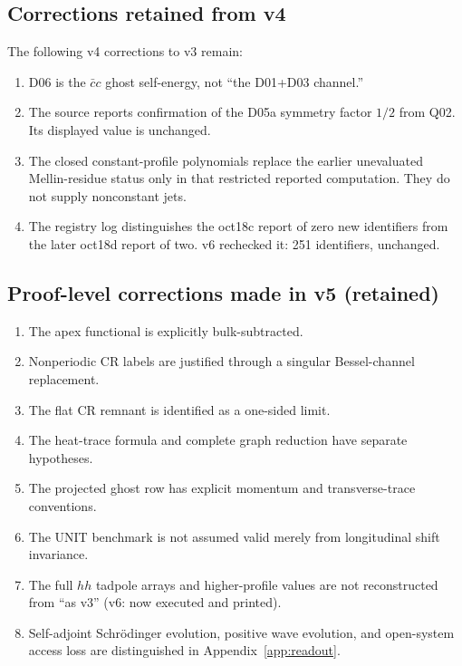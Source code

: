 \documentclass[11pt,a4paper]{article}
\theoremstyle{plain}
\theoremstyle{definition}
\theoremstyle{remark}
\numberwithin{equation}{section}
\begin{document}
\subsection{Corrections retained from v4}

The following v4 corrections to v3 remain:
\begin{enumerate}[label=\textup{(\roman*)}]
\item D06 is the \(\bar c c\) ghost self-energy, not
``the D01+D03 channel.''

\item The source reports confirmation of the D05a symmetry factor
\(1/2\) from Q02. Its displayed value is unchanged.

\item The closed constant-profile polynomials replace the earlier
unevaluated Mellin-residue status only in that restricted
reported computation. They do not supply nonconstant jets.

\item The registry log distinguishes the oct18c report of zero
new identifiers from the later oct18d report of two.
v6 rechecked it: 251 identifiers, unchanged.
\end{enumerate}

\subsection{Proof-level corrections made in v5 (retained)}

\begin{enumerate}[label=\textup{(\roman*)}]
\item The apex functional is explicitly bulk-subtracted.

\item Nonperiodic CR labels are justified through a singular
Bessel-channel replacement.

\item The flat CR remnant is identified as a one-sided limit.

\item The heat-trace formula and complete graph reduction have
separate hypotheses.

\item The projected ghost row has explicit momentum and
transverse-trace conventions.

\item The UNIT benchmark is not assumed valid merely from
longitudinal shift invariance.

\item The full \(hh\) tadpole arrays and higher-profile values are
not reconstructed from ``as v3'' (v6: now executed and printed).

\item Self-adjoint Schr\"odinger evolution, positive wave evolution,
and open-system access loss are distinguished in
Appendix~\ref{app:readout}.
\end{enumerate}
\end{document}
